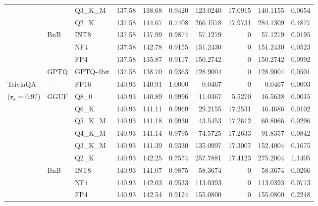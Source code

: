 \begin{longtable}{ll l rrrrrrr}
 &  & Q3\_K\_M & 137.58 & 138.68 & \cellcolor{red!18} 0.9420 & \cellcolor{red!18} 123.0240 & 17.0915 & \cellcolor{red!18} 140.1155 & \cellcolor{red!18} 0.0654 \\
 &  & Q2\_K & 137.58 & 144.67 & \cellcolor{red!35} 0.7408 & \cellcolor{red!35} 266.1578 & 17.9731 & \cellcolor{red!35} 284.1309 & \cellcolor{red!35} 0.4877 \\
 & BnB & INT8 & 137.58 & 137.99 & 0.9874 & 57.1279 & \cellcolor{cyan!12} $0$ & 57.1279 & 0.0195 \\
 &  & NF4 & 137.58 & 142.78 & \cellcolor{red!18} 0.9155 & \cellcolor{red!18} 151.2430 & \cellcolor{cyan!12} $0$ & \cellcolor{red!18} 151.2430 & \cellcolor{red!18} 0.0523 \\
 &  & FP4 & 137.58 & 135.87 & \cellcolor{red!18} 0.9117 & \cellcolor{red!18} 150.2742 & \cellcolor{cyan!12} $0$ & \cellcolor{red!18} 150.2742 & \cellcolor{red!18} 0.0992 \\
 & GPTQ & GPTQ-4bit & 137.58 & 138.70 & \cellcolor{red!18} 0.9363 & \cellcolor{red!18} 128.9004 & \cellcolor{cyan!12} $0$ & \cellcolor{red!18} 128.9004 & \cellcolor{red!18} 0.0501 \\
\midrule
TriviaQA & -- & FP16 & 140.93 & 140.91 & 1.0000 & 0.0467 & \cellcolor{cyan!12} $0$ & 0.0467 & 0.0003 \\
{\small ($\mathbf{r_s{=}0.97}$)} & GGUF & Q8\_0 & 140.93 & 140.89 & 0.9996 & 11.0367 & 5.5270 & 16.5638 & 0.0015 \\
 &  & Q6\_K & 140.93 & 141.11 & 0.9969 & 29.2155 & 17.2531 & 46.4686 & 0.0102 \\
 &  & Q5\_K\_M & 140.93 & 141.18 & 0.9930 & 43.5453 & 17.2612 & 60.8066 & 0.0296 \\
 &  & Q4\_K\_M & 140.93 & 141.14 & 0.9795 & 74.5725 & 17.2633 & 91.8357 & 0.0842 \\
 &  & Q3\_K\_M & 140.93 & 141.39 & \cellcolor{red!18} 0.9330 & \cellcolor{red!18} 135.0997 & 17.3007 & \cellcolor{red!18} 152.4004 & \cellcolor{red!18} 0.1675 \\
 &  & Q2\_K & 140.93 & 142.25 & \cellcolor{red!35} 0.7574 & \cellcolor{red!35} 257.7881 & 17.4123 & \cellcolor{red!35} 275.2004 & \cellcolor{red!35} 1.1405 \\
 & BnB & INT8 & 140.93 & 141.07 & 0.9875 & 58.3674 & \cellcolor{cyan!12} $0$ & 58.3674 & 0.0266 \\
 &  & NF4 & 140.93 & 142.03 & 0.9533 & 113.0393 & \cellcolor{cyan!12} $0$ & 113.0393 & 0.0773 \\
 &  & FP4 & 140.93 & 142.54 & \cellcolor{red!18} 0.9124 & \cellcolor{red!18} 155.0800 & \cellcolor{cyan!12} $0$ & \cellcolor{red!18} 155.0800 & \cellcolor{red!18} 0.2248 \\

\end{longtable}
